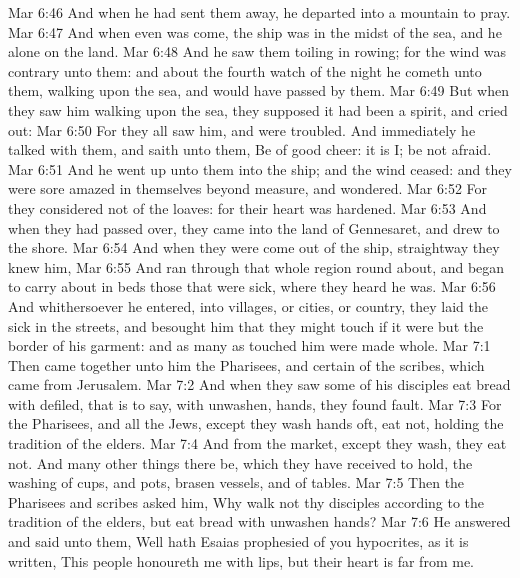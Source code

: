 \vs Mar 6:46 And when he had sent them away, he departed into a mountain to pray.
\vs Mar 6:47 And when even was come, the ship was in the midst of the sea, and he alone on the land.
\vs Mar 6:48 And he saw them toiling in rowing; for the wind was contrary unto them: and about the fourth watch of the night he cometh unto them, walking upon the sea, and would have passed by them.
\vs Mar 6:49 But when they saw him walking upon the sea, they supposed it had been a spirit, and cried out:
\vs Mar 6:50 For they all saw him, and were troubled. And immediately he talked with them, and saith unto them, Be of good cheer: it is I; be not afraid.
\vs Mar 6:51 And he went up unto them into the ship; and the wind ceased: and they were sore amazed in themselves beyond measure, and wondered.
\vs Mar 6:52 For they considered not  of the loaves: for their heart was hardened.
\vs Mar 6:53 And when they had passed over, they came into the land of Gennesaret, and drew to the shore.
\vs Mar 6:54 And when they were come out of the ship, straightway they knew him,
\vs Mar 6:55 And ran through that whole region round about, and began to carry about in beds those that were sick, where they heard he was.
\vs Mar 6:56 And whithersoever he entered, into villages, or cities, or country, they laid the sick in the streets, and besought him that they might touch if it were but the border of his garment: and as many as touched him were made whole.
\vs Mar 7:1 Then came together unto him the Pharisees, and certain of the scribes, which came from Jerusalem.
\vs Mar 7:2 And when they saw some of his disciples eat bread with defiled, that is to say, with unwashen, hands, they found fault.
\vs Mar 7:3 For the Pharisees, and all the Jews, except they wash  hands oft, eat not, holding the tradition of the elders.
\vs Mar 7:4 And  from the market, except they wash, they eat not. And many other things there be, which they have received to hold,  the washing of cups, and pots, brasen vessels, and of tables.
\vs Mar 7:5 Then the Pharisees and scribes asked him, Why walk not thy disciples according to the tradition of the elders, but eat bread with unwashen hands?
\vs Mar 7:6 He answered and said unto them, Well hath Esaias prophesied of you hypocrites, as it is written, This people honoureth me with  lips, but their heart is far from me.
